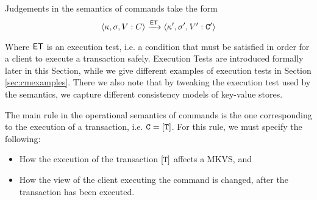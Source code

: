 %
Judgements in the semantics of commands take the form 
\[ 
\langle \kappa, \sigma, V: C \rangle \xrightarrow{\mathsf{ET}} \langle \kappa', \sigma', V': \texttt{C}' \rangle
\]

Where 
$\mathsf{ET}$ is an execution test, i.e. a condition that must be satisfied in 
order for a client to execute a transaction safely. 
Execution Tests are introduced formally later in this Section, while we 
give different examples of execution tests in Section \ref{sec:cmexamples}. 
There we also note that by tweaking the execution test used by the 
semantics, we capture different consistency models of 
key-value stores.

The main rule in the operational semantics of commands is the one corresponding 
to the execution of a transaction, i.e. $\texttt{C} = [\texttt{T}]$. For this rule, we must specify the following: 
\begin{itemize}
\item How the execution of the transaction $[\texttt{T}]$ affects a MKVS, and 
\item How the view of the client executing the command is changed, after the transaction 
has been executed. 
\end{itemize}

